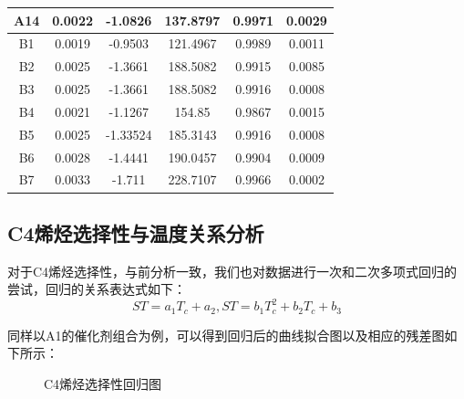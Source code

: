 \documentclass{article}
\begin{document}
\begin{table}[!h]
\begin{tabular}{|c|c|c|c|c|c|}
			A14                        & 0.0022  & -1.0826  & 137.8797  & 0.9971                   & 0.0029  \\ \hline
			B1                         & 0.0019  & -0.9503  & 121.4967  & 0.9989                   & 0.0011  \\ \hline
			B2                         & 0.0025  & -1.3661  & 188.5082  & 0.9915                   & 0.0085  \\ \hline
			B3                         & 0.0025  & -1.3661  & 188.5082  & 0.9916                   & 0.0008  \\ \hline
			B4                         & 0.0021  & -1.1267  & 154.85    & 0.9867                   & 0.0015  \\ \hline
			B5                         & 0.0025  & -1.33524 & 185.3143  & 0.9916                   & 0.0008  \\ \hline
			B6                         & 0.0028  & -1.4441  & 190.0457  & 0.9904                   & 0.0009  \\ \hline
			B7                         & 0.0033  & -1.711   & 228.7107  & 0.9966                   & 0.0002  \\ \hline
		\end{tabular}
	\end{table}

	\newpage
	\subsection{C4烯烃选择性与温度关系分析}
	对于C4烯烃选择性，与前分析一致，我们也对数据进行一次和二次多项式回归的尝试，回归的关系表达式如下：
	\begin{equation}
		ST=a_1T_c+a_2,ST=b_1T_c^2+b_2T_c+b_3
	\end{equation}

	同样以A1的催化剂组合为例，可以得到回归后的曲线拟合图以及相应的残差图如下所示：
	\begin{figure}[!h]
		\centering 
		\caption{C4烯烃选择性回归图}
	\end{figure}
	
\end{document}
